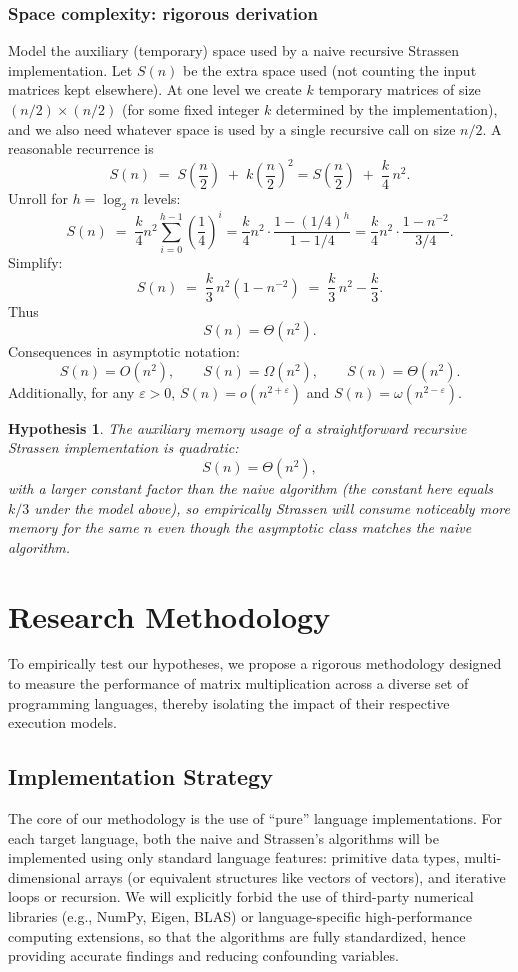 \documentclass[11pt, a4paper, titlepage]{scrartcl}
\newtheorem{hypothesis}{Hypothesis}
\begin{document}
\subsubsection{Space complexity: rigorous derivation}
Model the auxiliary (temporary) space used by a naive recursive Strassen implementation. Let $S(n)$ be the extra space used (not counting the input matrices kept elsewhere). At one level we create $k$ temporary matrices of size $(n/2)\times (n/2)$ (for some fixed integer $k$ determined by the implementation), and we also need whatever space is used by a single recursive call on size $n/2$. A reasonable recurrence is
\[
S(n) \;=\; S\!\left(\frac{n}{2}\right) \;+\; k\left(\frac{n}{2}\right)^2
= S\!\left(\frac{n}{2}\right) \;+\; \frac{k}{4}\, n^2.
\]
Unroll for $h=\log_2 n$ levels:
\[
S(n) \;=\; \frac{k}{4} n^2 \sum_{i=0}^{h-1} \left(\frac{1}{4}\right)^i
= \frac{k}{4} n^2 \cdot \frac{1 - (1/4)^h}{1 - 1/4}
= \frac{k}{4} n^2 \cdot \frac{1 - n^{-2}}{3/4}.
\]
Simplify:
\[
S(n) \;=\; \frac{k}{3}\, n^2 \left(1 - n^{-2}\right) \;=\; \frac{k}{3}\, n^2 - \frac{k}{3}.
\]
Thus
\[
S(n) = \Theta(n^2).
\]
Consequences in asymptotic notation:
\[
S(n)=O(n^2),\qquad S(n)=\Omega(n^2),\qquad S(n)=\Theta(n^2).
\]
Additionally, for any $\varepsilon>0$, $S(n)=o(n^{2+\varepsilon})$ and $S(n)=\omega(n^{2-\varepsilon})$.

\begin{hypothesis}
The auxiliary memory usage of a straightforward recursive Strassen implementation is quadratic:
\[
S(n) = \Theta(n^2),
\]
with a larger constant factor than the naive algorithm (the constant here equals $k/3$ under the model above), so empirically Strassen will consume noticeably more memory for the same $n$ even though the asymptotic class matches the naive algorithm.
\end{hypothesis}

\newpage

\section{Research Methodology}

To empirically test our hypotheses, we propose a rigorous methodology designed to measure the performance of matrix multiplication across a diverse set of programming languages, thereby isolating the impact of their respective execution models.

\subsection{Implementation Strategy}
The core of our methodology is the use of ``pure'' language implementations. For each target language, both the naive and Strassen's algorithms will be implemented using only standard language features: primitive data types, multi-dimensional arrays (or equivalent structures like vectors of vectors), and iterative loops or recursion. We will explicitly forbid the use of third-party numerical libraries (e.g., NumPy, Eigen, BLAS) or language-specific high-performance computing extensions, so that the algorithms are fully standardized, hence providing accurate findings and reducing confounding variables.
\end{document}
